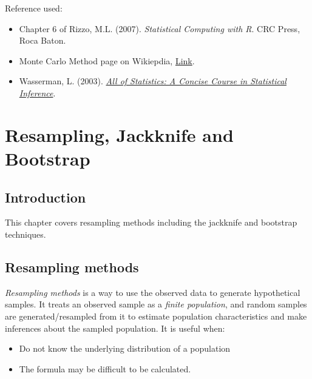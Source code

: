 \documentclass[
  letterpaper,
  DIV=11,
  numbers=noendperiod]{scrreprt}
\begin{document}
Reference used:

\begin{itemize}
\item
  Chapter 6 of Rizzo, M.L. (2007). \emph{Statistical Computing with R}.
  CRC Press, Roca Baton.
\item
  Monte Carlo Method page on Wikiepdia,
  \href{https://en.wikipedia.org/wiki/Monte_Carlo_method}{Link}.
\item
  Wasserman, L. (2003).
  \href{https://egrcc.github.io/docs/math/all-of-statistics.pdf}{\emph{All
  of Statistics: A Concise Course in Statistical Inference}}.
\end{itemize}


\chapter{Resampling, Jackknife and
Bootstrap}\label{resampling-jackknife-and-bootstrap}

\newcommand{\E}{\mathbb{E}}
\newcommand{\R}{\mathbb{R}}
\newcommand{\var}{\mathbb{V}ar}
\newcommand{\cov}{\mathbb{C}ov}
\newcommand{\corr}{\mathbb{C}orr}
\newcommand{\unif}{\operatorname{Unif}}
\newcommand{\geom}{\operatorname{Geom}}
\newcommand{\bet}{\operatorname{Beta}}
\newcommand{\bern}{\operatorname{Bern}}
\newcommand{\iid}{\overset{iid}{\sim}}
\newcommand{\ef}{\operatorname{Eff}}
\newcommand{\htt}{\hat{\theta}}
\newcommand{\b}{\mathbb b}

\section{Introduction}\label{introduction}

This chapter covers resampling methods including the jackknife and
bootstrap techniques.

\section{Resampling methods}\label{resampling-methods}

\emph{Resampling methods} is a way to use the observed data to generate
hypothetical samples. It treats an observed sample as a \emph{finite
population}, and random samples are generated/resampled from it to
estimate population characteristics and make inferences about the
sampled population. It is useful when:

\begin{itemize}
\item
  Do not know the underlying distribution of a population
\item
  The formula may be difficult to be calculated.
\end{itemize}
\end{document}
